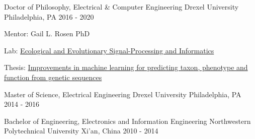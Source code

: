 

\begin{cventries}

  \cventry
    {Doctor of Philosophy, Electrical \& Computer Engineering} %
    {Drexel University} %
    {Philadelphia, PA} %
    {2016 - 2020} %
    {
     \begin{cvitems} %
         \item Mentor: Gail L. Rosen PhD
         \item Lab: \href{http://drexeleesi.com/}{Ecological and Evolutionary Signal-Processing and Informatics}
	 \item Thesis: \href{https://drexel.primo.exlibrisgroup.com/permalink/01DRXU_INST/1aqopv8/alma991014833048604721}{Improvements in machine learning for predicting taxon, phenotype and function from genetic sequences}
      \end{cvitems}
    }
    
  \cventry
    {Master of Science, Electrical Engineering} %
    {Drexel University} %
    {Philadelphia, PA} %
    {2014 - 2016} %
    {}
    
  \cventry
    {Bachelor of Engineering, Electronics and Information Engineering} %
    {Northwestern Polytechnical University} %
    {Xi'an, China} %
    {2010 - 2014} %
    {}

\end{cventries}
